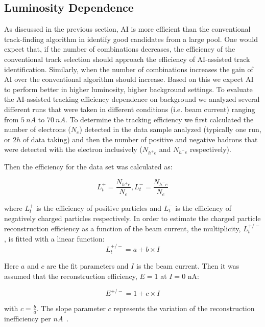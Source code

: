 \subsection{Luminosity Dependence}
As discussed in the previous section, AI is more efficient than the conventional track-finding 
algorithm in identify good candidates from a large pool. One would expect that, if the number 
of combinations decreases, the efficiency of the conventional track selection should approach the 
efficiency of AI-assisted track identification. Similarly, when the number of combinations 
increases the gain of AI over the conventional algorithm should increase. Based on this we 
expect AI to perform better in higher luminosity, higher background settings. To evaluate the 
AI-assisted tracking efficiency dependence on background we analyzed several different runs 
that were taken in different conditions (i.e. beam current) ranging from $5~nA$ to $70~nA$. 
To determine the tracking efficiency we first calculated the number of electrons ($N_e$) detected 
in the data sample analyzed (typically one run, or $2h$ of data taking) and then the number of 
positive and negative hadrons that were detected with the electron inclusively ($N_{h^+e}$ and 
$N_{h^-e}$ respectively).

Then the efficiency for the data set was calculated as:

\begin{equation}
L_t^+ = \frac{N_{h^+e}}{N_e} , L_t^- = \frac{N_{h^-e}}{N_e} 
\end{equation}

where $L_t^+$ is the efficiency of positive particles and $L_t^-$ is the efficiency of negatively 
charged particles respectively. In order to estimate the charged particle reconstruction efficiency 
as a function of the beam current, the multiplicity, $L_t^{+/-}$, is fitted with a linear function:
\begin{equation}
L_t^{+/-} = a + b\times I 
\end{equation}

Here $a$ and $c$ are the fit parameters and $I$ is the beam current. Then it was assumed that the 
reconstruction efficiency, $E=1$ at $I=0$ nA:

\begin{equation}
E^{+/-} = 1 + c \times I 
\end{equation}

with $c=\frac{b}{a}$. The slope parameter $c$ represents the variation of the reconstruction 
inefficiency per $nA$~\cite{Stepanyan:2020bg}.
 
